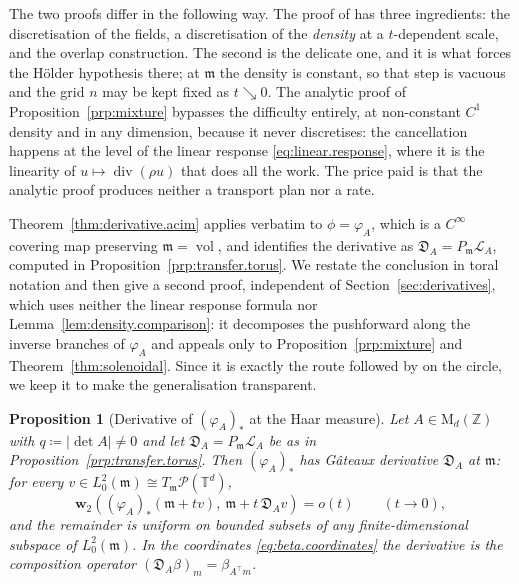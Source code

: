\documentclass[11pt,reqno]{amsart}
\theoremstyle{plain}
\newtheorem{prp}[thm]{Proposition}
\theoremstyle{definition}
\newcommand{\dw}{\mathbf{w}_2}
\newcommand{\T}{\mathbb{T}}
\newcommand{\Z}{\mathbb{Z}}
\newcommand{\Leb}{\mathfrak{m}}
\newcommand{\D}{\mathfrak{D}}
\newcommand{\Prob}{\mathcal{P}}
\newcommand{\Transf}{\mathcal{L}}
\DeclareMathOperator{\vol}{vol}
\DeclareMathOperator{\Div}{div}
\begin{document}
The two proofs differ in the following way.
The proof of \cite[Lemma 4.2]{kloeckner_optimal_2013_preprint} has three ingredients: the discretisation of the fields, a discretisation of the \emph{density} at a \( t \)-dependent scale, and the overlap construction.
The second is the delicate one, and it is what forces the Hölder hypothesis there; at \( \Leb \) the density is constant, so that step is vacuous and the grid \( n \) may be kept fixed as \( t\searrow0 \).
The analytic proof of Proposition~\ref{prp:mixture} bypasses the difficulty entirely, at non-constant \( C^1 \) density and in any dimension, because it never discretises: the cancellation happens at the level of the linear response \eqref{eq:linear.response}, where it is the linearity of \( u\mapsto\Div(\rho u) \) that does all the work.
The price paid is that the analytic proof produces neither a transport plan nor a rate.

Theorem~\ref{thm:derivative.acim} applies verbatim to \( \phi=\varphi_A \), which is a \( C^\infty \) covering map preserving \( \Leb=\vol \), and identifies the derivative as \( \D_A=P_\Leb\Transf_A \), computed in Proposition~\ref{prp:transfer.torus}.
We restate the conclusion in toral notation and then give a second proof, independent of Section~\ref{sec:derivatives}, which uses neither the linear response formula nor Lemma~\ref{lem:density.comparison}: it decomposes the pushforward along the inverse branches of \( \varphi_A \) and appeals only to Proposition~\ref{prp:mixture} and Theorem~\ref{thm:solenoidal}.
Since it is exactly the route followed by \cite[\S5]{kloeckner_optimal_2013} on the circle, we keep it to make the generalisation transparent.

\begin{prp}[Derivative of \( ( \varphi_A )_\ast  \) at the Haar measure]
    \label{prp:derivative.torus}
    Let \( A\in \mathrm{M}_d(\Z) \) with \( q\coloneqq\lvert \det A \rvert\neq 0 \) and let \( \D_A=P_\Leb\Transf_A  \) be as in Proposition~\ref{prp:transfer.torus}.
    Then \( ( \varphi_A )_\ast  \) has G\^ateaux derivative \( \D_A \) at \( \Leb \): for every \( v\in L^2_0(\Leb)\cong T_\Leb \Prob(\T^d) \),
    \begin{equation}\label{eq:gateaux}
        \dw\left(( \varphi_A )_\ast (\Leb+tv),\ \Leb+t\,\D_Av\right)=o(t)\qquad(t\to0),
    \end{equation}
    and the remainder is uniform on bounded subsets of any finite-dimensional subspace of \( L^2_0(\Leb) \).
    In the coordinates \eqref{eq:beta.coordinates} the derivative is the composition operator \( (\D_A\beta)_m=\beta_{A^{\top}m} \).
\end{prp}
\end{document}
